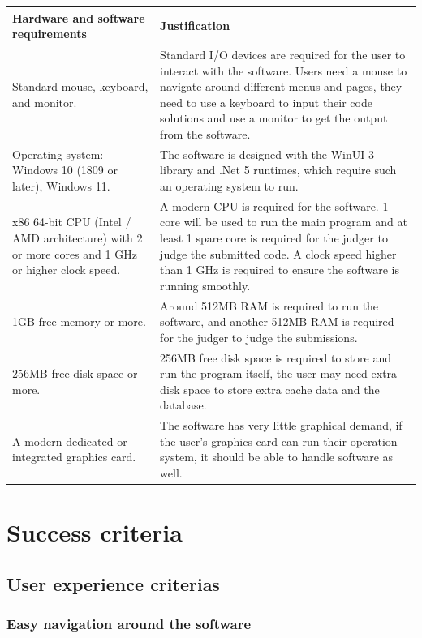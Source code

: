 \documentclass[a4paper]{report}
\begin{document}
\begin{tabulary}{\linewidth}{|L|L|}
    \hline
    Hardware and software requirements & Justification \\
    \hline
    Standard mouse, keyboard, and monitor. & Standard I/O devices are required for the user to interact with the software. Users need a mouse to navigate around different menus and pages, they need to use a keyboard to input their code solutions and use a monitor to get the output from the software. \\
    \hline
    Operating system: Windows 10 (1809 or later), Windows 11. & The software is designed with the WinUI 3 library and .Net 5 runtimes, which require such an operating system to run. \\
    \hline
    x86 64-bit CPU (Intel / AMD architecture) with 2 or more cores and 1 GHz or higher clock speed. & A modern CPU is required for the software. 1 core will be used to run the main program and at least 1 spare core is required for the judger to judge the submitted code. A clock speed higher than 1 GHz is required to ensure the software is running smoothly. \\
    \hline
    1GB free memory or more. & Around 512MB RAM is required to run the software, and another 512MB RAM is required for the judger to judge the submissions. \\
    \hline
    256MB free disk space or more. & 256MB free disk space is required to store and run the program itself, the user may need extra disk space to store extra cache data and the database. \\
    \hline
    A modern dedicated or integrated graphics card. & The software has very little graphical demand, if the user's graphics card can run their operation system, it should be able to handle software as well. \\
    \hline
\end{tabulary}

\section{Success criteria}

\subsection{User experience criterias}

\subsubsection{Easy navigation around the software}
\end{document}

